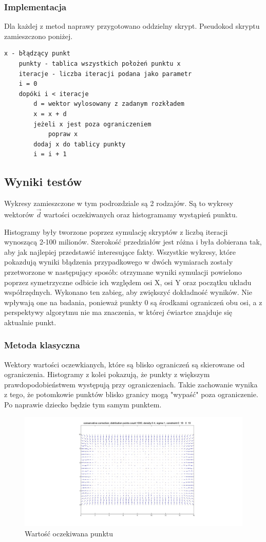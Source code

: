 \documentclass{mini}
\begin{document}
\subsubsection*{Implementacja}
Dla każdej z metod naprawy przygotowano oddzielny skrypt. Pseudokod skryptu zamieszczono poniżej.
\begin{Verbatim}[baselinestretch=1.1]
	x - błądzący punkt
	punkty - tablica wszystkich położeń punktu x
	iteracje - liczba iteracji podana jako parametr
	i = 0
	dopóki i < iteracje
		d = wektor wylosowany z zadanym rozkładem
		x = x + d
		jeżeli x jest poza ograniczeniem
			popraw x
		dodaj x do tablicy punkty
		i = i + 1
\end{Verbatim}

\subsection{Wyniki testów}
Wykresy zamieszczone w tym podrozdziale są 2 rodzajów. Są to wykresy wektorów $\overrightarrow{d}$ wartości oczekiwanych oraz histogramamy wystąpień punktu.

Histogramy były tworzone poprzez symulację skryptów z liczbą iteracji wynoszącą \mbox{2-100} milionów. Szerokość przedziałów jest różna i była dobierana tak, aby jak najlepiej przedstawić interesujące fakty. Wszystkie wykresy, które pokazdują wyniki błądzenia przypadkowego w dwóch wymiarach zostały przetworzone w następujący sposób: otrzymane wyniki symulacji powielono poprzez symetrzyczne odbicie ich względem osi X, osi Y oraz początku układu współrzędnych. Wykonano ten zabieg, aby zwiększyć dokładność wyników. Nie wpływają one na badania, ponieważ punkty 0 są środkami ograniczeń obu osi, a z perspektywy algorytmu nie ma znaczenia, w której ćwiartce znajduje się aktualnie punkt.

\subsubsection*{Metoda klasyczna}
Wektory wartości oczewkianych, które są blisko ograniczeń są skierowane od ograniczenia. Histogramy z kolei pokazują, że punkty z większym prawdopodobieństwem występują przy ograniczeniach. Takie zachowanie wynika z tego, że potomkowie punktów blisko granicy mogą "wypaść" poza ograniczenie. Po naprawie dziecko będzie tym samym punktem.

\begin{figure}[H]
\centering
\includegraphics[width=\textwidth]{conservative2dprzesuniecie}
\caption{Wartość oczekiwana punktu}
\end{figure}
\end{document}
